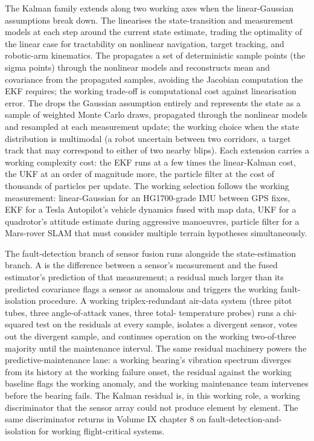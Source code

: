 The Kalman family extends along two working axes when the
linear-Gaussian assumptions break down. The
 linearises the
state-transition and measurement models at each step around the
current state estimate, trading the optimality of the linear case
for tractability on nonlinear navigation, target tracking, and
robotic-arm kinematics. The 
propagates a set of deterministic sample points (the sigma points)
through the nonlinear models and reconstructs mean and covariance
from the propagated samples, avoiding the Jacobian computation the
EKF requires; the working trade-off is computational cost against
linearisation error. The  drops the
Gaussian assumption entirely and represents the state as a sample
of weighted Monte Carlo draws, propagated through the nonlinear
models and resampled at each measurement update; the working choice
when the state distribution is multimodal (a robot uncertain between
two corridors, a target track that may correspond to either of two
nearby blips). Each extension carries a working complexity cost:
the EKF runs at a few times the linear-Kalman cost, the UKF at an
order of magnitude more, the particle filter at the cost of
thousands of particles per update. The working selection follows
the working measurement: linear-Gaussian for an HG1700-grade IMU
between GPS fixes, EKF for a Tesla Autopilot's vehicle dynamics
fused with map data, UKF for a quadrotor's attitude estimate during
aggressive manoeuvres, particle filter for a Mars-rover SLAM that
must consider multiple terrain hypotheses simultaneously.

The fault-detection branch of sensor fusion runs alongside the
state-estimation branch. A  is the difference
between a sensor's measurement and the fused estimator's prediction
of that measurement; a residual much larger than its predicted
covariance flags a sensor as anomalous and triggers the working
fault-isolation procedure. A working triplex-redundant air-data
system (three pitot tubes, three angle-of-attack vanes, three total-
temperature probes) runs a chi-squared test on the residuals at
every sample, isolates a divergent sensor, votes out the divergent
sample, and continues operation on the working two-of-three majority
until the maintenance interval. The same residual machinery powers
the predictive-maintenance lane: a working bearing's vibration
spectrum diverges from its history at the working failure onset,
the residual against the working baseline flags the working anomaly,
and the working maintenance team intervenes before the bearing
fails. The Kalman residual is, in this working role, a working
discriminator that the sensor array could not produce element by
element. The same discriminator returns in Volume IX chapter 8 on
fault-detection-and-isolation for working flight-critical systems.

